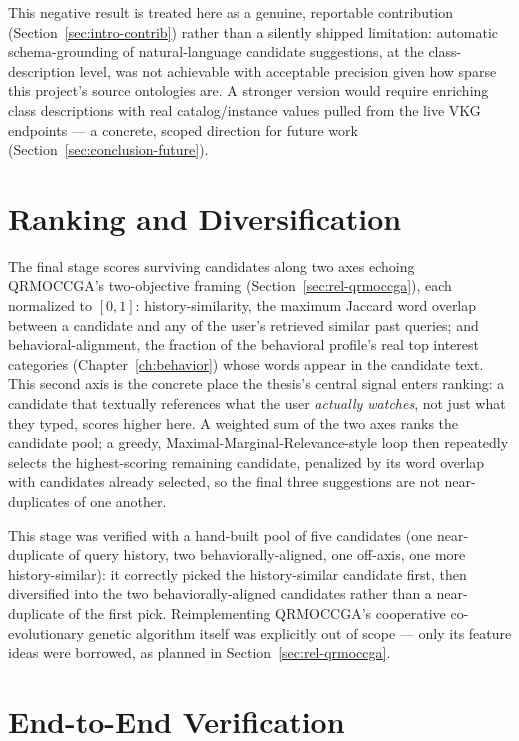 This negative result is treated here as a genuine, reportable contribution
(Section~\ref{sec:intro-contrib}) rather than a silently shipped limitation: automatic
schema-grounding of natural-language candidate suggestions, at the class-description level, was not
achievable with acceptable precision given how sparse this project's source ontologies are. A
stronger version would require enriching class descriptions with real catalog/instance values pulled
from the live VKG endpoints --- a concrete, scoped direction for future work
(Section~\ref{sec:conclusion-future}).

\section{Ranking and Diversification}
\label{sec:rec-ranking}

The final stage scores surviving candidates along two axes echoing QRMOCCGA's two-objective framing
(Section~\ref{sec:rel-qrmoccga}), each normalized to $[0,1]$: history-similarity, the maximum
Jaccard word overlap between a candidate and any of the user's retrieved similar past queries; and
behavioral-alignment, the fraction of the behavioral profile's real top interest categories
(Chapter~\ref{ch:behavior}) whose words appear in the candidate text. This second axis is the
concrete place the thesis's central signal enters ranking: a candidate that textually references
what the user \emph{actually watches}, not just what they typed, scores higher here. A weighted sum
of the two axes ranks the candidate pool; a greedy, Maximal-Marginal-Relevance-style loop then
repeatedly selects the highest-scoring remaining candidate, penalized by its word overlap with
candidates already selected, so the final three suggestions are not near-duplicates of one another.

This stage was verified with a hand-built pool of five candidates (one near-duplicate of query
history, two behaviorally-aligned, one off-axis, one more history-similar): it correctly picked the
history-similar candidate first, then diversified into the two behaviorally-aligned candidates
rather than a near-duplicate of the first pick. Reimplementing QRMOCCGA's cooperative
co-evolutionary genetic algorithm itself was explicitly out of scope --- only its feature ideas were
borrowed, as planned in Section~\ref{sec:rel-qrmoccga}.

\section{End-to-End Verification}
\label{sec:rec-verification}

